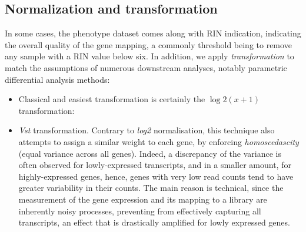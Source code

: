 \subsection{Normalization and transformation} 
\label{normalization-and-transformation}

In some cases, the phenotype dataset comes along with RIN indication, indicating the overall quality of the gene mapping, a commonly threshold being to remove any sample with a RIN value below six. In addition, we apply \emph{transformation} to match the assumptions of numerous downstream analyses, notably parametric differential analysis methods:

\begin{itemize}

\item
  Classical and easiest transformation is certainly the \(\log2(x+1)\) transformation:
\end{itemize}

\begin{Shaded}
\begin{Highlighting}
\OtherTok{\textless{}{-}}\SpecialCharTok{::}\NormalTok{(}
\SpecialCharTok{\textasciitilde{}}\SpecialCharTok{+} \NormalTok{))}
\end{Highlighting}
\end{Shaded}

\begin{itemize}

\item
  \emph{Vst} transformation. Contrary to \emph{log2} normalisation, this technique also attempts to assign a similar weight to each gene, by enforcing \emph{homoscedascity} (equal variance across all genes). Indeed, a discrepancy of the variance is often observed for lowly-expressed transcripts, and in a smaller amount, for highly-expressed genes, hence, genes with very low read counts tend to have greater variability in their counts. The main reason is technical, since the measurement of the gene expression and its mapping to a library are inherently noisy processes, preventing from effectively capturing all transcripts, an effect that is drastically amplified for lowly expressed genes\autocite{klaus_reisenauer18}.
\end{itemize}

